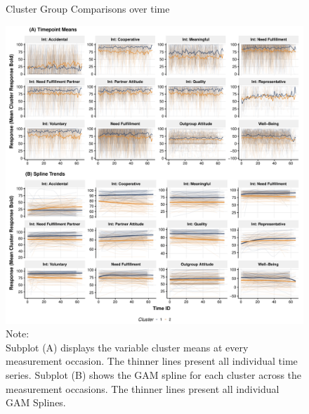 \begin{figure}[!ht] %
  \caption{Cluster Group Comparisons over time}
  \label{fig:clusterTs}
  \centering\includegraphics[width=\textwidth]{figures/clusterTsComb.pdf}
  \caption*{Note: \\
  Subplot (A) displays the variable cluster means at every measurement occasion. The thinner lines present all individual time series. Subplot (B) shows the GAM spline for each cluster across the measurement occasions. The thinner lines present all individual GAM Splines.}
\end{figure}
